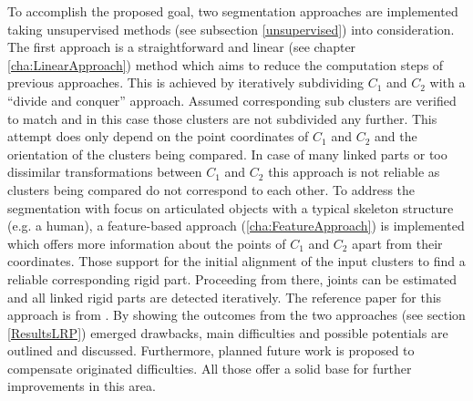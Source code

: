 To accomplish the proposed goal, two segmentation approaches are implemented taking unsupervised methods (see subsection \ref{unsupervised}) into consideration. The first approach is a straightforward and linear (see chapter \ref{cha:LinearApproach}) method which aims to reduce the computation steps of previous approaches. This is achieved by iteratively subdividing $C_1$ and $C_2$ with a ``divide and conquer'' approach. Assumed corresponding sub clusters are verified to match and in this case those clusters are not subdivided any further. This attempt does only depend on the point coordinates of $C_1$ and $C_2$ and the orientation of the clusters being compared. In case of many linked parts or too dissimilar transformations between $C_1$ and $C_2$ this approach is not reliable as clusters being compared do not correspond to each other. To address the segmentation with focus on articulated objects with a typical skeleton structure (e.g. a human), a feature-based approach (\ref{cha:FeatureApproach}) is implemented which offers more information about the points of $C_1$ and $C_2$ apart from their coordinates. Those support for the initial alignment of the input clusters to find a reliable corresponding rigid part. Proceeding from there, joints can be estimated and all linked rigid parts are detected iteratively. The reference paper for this approach is from \cite{guo2016correspondence}. By showing the outcomes from the two approaches (see section \ref{ResultsLRP}) emerged drawbacks, main difficulties and possible potentials are outlined and discussed. Furthermore, planned future work is proposed to compensate originated difficulties. All those offer a solid base for further improvements in this area. 




